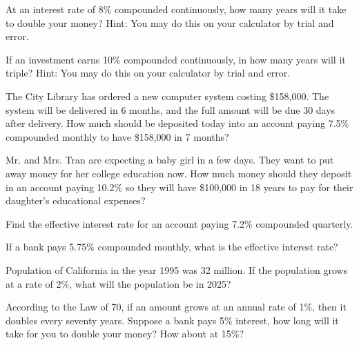 \begin{puzzle}
    At an interest rate of 8\% compounded continuously, how many years will it take to double your money? Hint: You may do this on your calculator by trial and error.
\end{puzzle}

\begin{puzzle}
    If an investment earns 10\% compounded continuously, in how many years will it triple? Hint: You may do this on your calculator by trial and error.
\end{puzzle}

\begin{puzzle}
    The City Library has ordered a new computer system costing \$158,000. The system will be delivered in 6 months, and the full amount will be due 30 days after delivery. How much should be deposited today into an account paying 7.5\% compounded monthly to have \$158,000 in 7 months?
\end{puzzle}

\begin{puzzle}
    Mr. and Mrs. Tran are expecting a baby girl in a few days. They want to put away money for her college education now. How much money should they deposit in an account paying 10.2\% so they will have \$100,000 in 18 years to pay for their daughter’s educational expenses?
\end{puzzle}

\begin{puzzle}
    Find the effective interest rate for an account paying 7.2\% compounded quarterly.
\end{puzzle}

\begin{puzzle}
    If a bank pays 5.75\% compounded monthly, what is the effective interest rate?
\end{puzzle}

\begin{puzzle}
    Population of California in the year 1995 was 32 million. If the population grows at a rate of 2\%, what will the population be in 2025?
\end{puzzle}

\begin{puzzle}
    According to the Law of 70, if an amount grows at an annual rate of 1\%, then it doubles every seventy years. Suppose a bank pays 5\% interest, how long will it take for you to double your money? How about at 15\%?
\end{puzzle}
